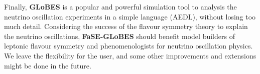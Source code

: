 \documentclass[aps,prd,nofootinbib,preprint]{revtex4}
\begin{document}
Finally, \textbf{GLoBES} is a popular and powerful simulation tool to analysis the neutrino oscillation experiments in a simple language (AEDL), without losing too much detail. Considering the success of the flavour symmetry theory to explain the neutrino oscillations, \textbf{FaSE-GLoBES} should benefit model builders of leptonic flavour symmetry and phenomenologists for neutrino oscillation physics. We leave the flexibility for the user, and some other improvements and extensions might be done in the future.
 


%

\end{document}
